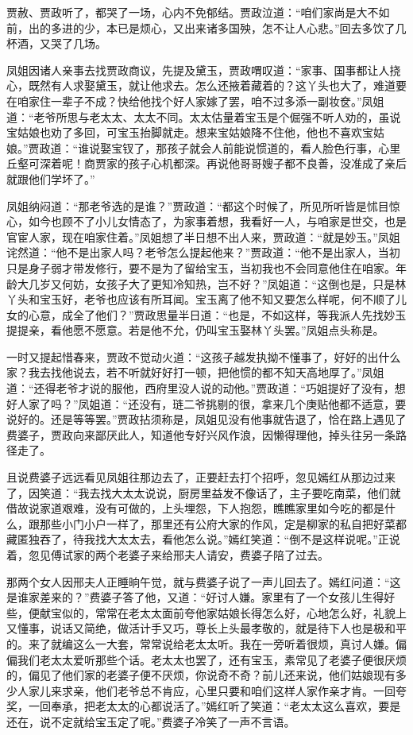 \documentclass[12pt,oneside]{book}
\begin{document}
贾赦、贾政听了，都哭了一场，心内不免郁结。贾政泣道：“咱们家尚是大不如前，出的多进的少，本已是烦心，又出来诸多国殃，怎不让人心悲。”回去多饮了几杯酒，又哭了几场。

凤姐因诸人亲事去找贾政商议，先提及黛玉，贾政喟叹道：“家事、国事都让人挠心，既然有人求娶黛玉，就让他求去。怎么还掖着藏着的？这丫头也大了，难道要在咱家住一辈子不成？快给他找个好人家嫁了罢，咱不过多添一副妆奁。”凤姐道：“老爷所思与老太太、太太不同。太太估量着宝玉是个倔强不听人劝的，虽说宝姑娘也劝了多回，可宝玉抬脚就走。想来宝姑娘降不住他，他也不喜欢宝姑娘。”贾政道：“谁说娶宝钗了，那孩子就会人前能说惯道的，看人脸色行事，心里丘壑可深着呢！商贾家的孩子心机都深。再说他哥哥嫂子都不良善，没准成了亲后就跟他们学坏了。”

凤姐纳闷道：“那老爷选的是谁？”贾政道：“都这个时候了，所见所听皆是怵目惊心，如今也顾不了小儿女情态了，为家事着想，我看好一人，与咱家是世交，也是官宦人家，现在咱家住着。”凤姐想了半日想不出人来，贾政道：“就是妙玉。”凤姐诧然道：“他不是出家人吗？老爷怎么提起他来？”贾政道：“他不是出家人，当初只是身子弱才带发修行，要不是为了留给宝玉，当初我也不会同意他住在咱家。年龄大几岁又何妨，女孩子大了更知冷知热，岂不好？”凤姐道：“这倒也是，只是林丫头和宝玉好，老爷也应该有所耳闻。宝玉离了他不知又要怎么样呢，何不顺了儿女的心意，成全了他们？”贾政思量半日道：“也是，不如这样，等我派人先找妙玉提提亲，看他愿不愿意。若是他不允，仍叫宝玉娶林丫头罢。”凤姐点头称是。

一时又提起惜春来，贾政不觉动火道：“这孩子越发执拗不懂事了，好好的出什么家？我去找他说去，若不听就好好打一顿，把他惯的都不知天高地厚了。”凤姐道：“还得老爷才说的服他，西府里没人说的动他。”贾政道：“巧姐提好了没有，想好人家了吗？”凤姐道：“还没有，琏二爷挑剔的很，拿来几个庚贴他都不适意，要说好的。还是等等罢。”贾政拈须称是，凤姐见没有他事就告退了，恰在路上遇见了费婆子，贾政向来鄙厌此人，知道他专好兴风作浪，因懒得理他，掉头往另一条路径走了。

且说费婆子远远看见凤姐往那边去了，正要赶去打个招呼，忽见嫣红从那边过来了，因笑道：“我去找大太太说说，厨房里益发不像话了，主子要吃南菜，他们就借故说家道艰难，没有可做的，上头埋怨，下人抱怨，瞧瞧家里如今吃的都是什么，跟那些小门小户一样了，那里还有公府大家的作风，定是柳家的私自把好菜都藏匿独吞了，待我找大太太去，看他怎么说。”嫣红笑道：“倒不是这样说呢。”正说着，忽见傅试家的两个老婆子来给邢夫人请安，费婆子陪了过去。

那两个女人因邢夫人正睡晌午觉，就与费婆子说了一声儿回去了。嫣红问道：“这是谁家差来的？”费婆子答了他，又道：“好讨人嫌。家里有了一个女孩儿生得好些，便献宝似的，常常在老太太面前夸他家姑娘长得怎么好，心地怎么好，礼貌上又懂事，说话又简绝，做活计手又巧，尊长上头最孝敬的，就是待下人也是极和平的。来了就编这么一大套，常常说给老太太听。我在一旁听着很烦，真讨人嫌。偏偏我们老太太爱听那些个话。老太太也罢了，还有宝玉，素常见了老婆子便很厌烦的，偏见了他们家的老婆子便不厌烦，你说奇不奇？前儿还来说，他们姑娘现有多少人家儿来求亲，他们老爷总不肯应，心里只要和咱们这样人家作亲才肯。一回夸奖，一回奉承，把老太太的心都说活了。”嫣红听了笑道：“老太太这么喜欢，要是还在，说不定就给宝玉定了呢。”费婆子冷笑了一声不言语。
\end{document}
